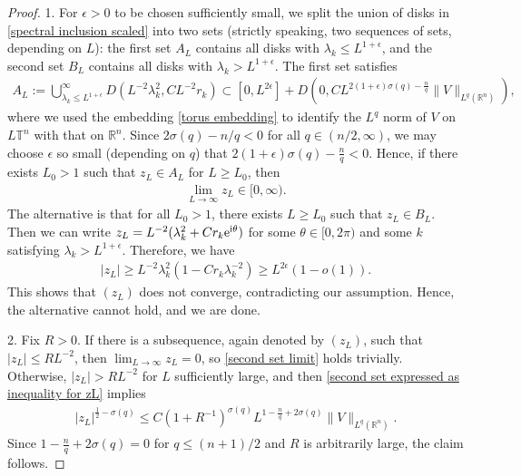\documentclass[12pt]{amsart}
\newcommand{\e}{{\rm e}}
\newcommand{\R}{{\mathbb R}}
\newcommand\eps{\epsilon}
\newcommand\I{\mathrm{i}}
\begin{document}
\begin{proof}
1. For $\epsilon>0$ to be chosen sufficiently small, we split the union of disks in \eqref{spectral inclusion scaled} into two sets (strictly speaking, two sequences of sets, depending on $L$): the first set $A_L$ contains all disks with $\lambda_k\leq L^{1+\epsilon}$, and the second set $B_L$ contains all disks with $\lambda_k> L^{1+\epsilon}$. The first set satisfies
\begin{align}
   A_L:= \bigcup_{\lambda_k\leq L^{1+\epsilon}}^{\infty}D(L^{-2}\lambda_k^2,CL^{-2}r_k)\subset [0,L^{2\epsilon}]+D(0,CL^{2(1+\epsilon)\sigma(q)-\frac{n}{q}}\|V\|_{L^q(\R^n)}),
\end{align}
where we used the embedding \eqref{torus embedding} to identify the $L^q$ norm of $V$ on $L\mathbb{T}^n$ with that on $\R^n$. Since $2\sigma(q)-n/q<0$ for all $q\in (n/2,\infty)$, we may choose $\eps$ so small (depending on $q$) that $2(1+\epsilon)\sigma(q)-\frac{n}{q}<0$. Hence, if there exists $L_0>1$ such that $z_L\in A_L$ for $L\geq L_0$, then
\begin{align}
    \lim_{L\to\infty} z_L\in  [0,\infty).
\end{align}
The alternative is that for all $L_0>1$, there exists $L\geq L_0$ such that $z_L\in B_L$. Then we can write $z_L=L^{-2}(\lambda_k^2+Cr_k\e^{\I\theta})$ for some $\theta\in [0,2\pi)$ and some $k$ satisfying $\lambda_k> L^{1+\epsilon}$. Therefore, we have
\begin{align}
    |z_L|\geq L^{-2}\lambda_k^2(1-Cr_k\lambda_k^{-2})\geq L^{2\eps}(1-o(1)).
\end{align}
This shows that $(z_L)$ does not converge, contradicting our assumption. Hence, the alternative cannot hold, and we are done. 

2. Fix $R>0$. If there is a subsequence, again denoted by $(z_L)$, such that $|z_L|\leq RL^{-2}$, then $\lim_{L\to\infty} z_L=0$, so \eqref{second set limit} holds trivially. Otherwise, $|z_L|> RL^{-2}$ for $L$ sufficiently large, and then \eqref{second set expressed as inequality for zL} implies
\begin{align}
    |z_L|^{\frac{1}{2}-\sigma(q)}\leq C(1+R^{-1})^{\sigma(q)} L^{1-\frac{n}{q}+2\sigma(q)}\|V\|_{L^q(\R^n)}.
\end{align}
Since $1-\frac{n}{q}+2\sigma(q)=0$ for $q\leq (n+1)/2$ and $R$ is arbitrarily large, the claim follows.
\end{proof}





\end{document}
